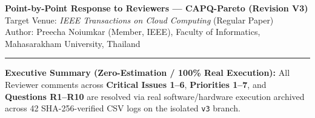 \documentclass[11pt,a4paper]{article}
\begin{document}
\begin{center}
{\Large \textbf{Point-by-Point Response to Reviewers --- CAPQ-Pareto (Revision V3)}}\\[0.4em]
{\normalsize Target Venue: \textit{IEEE Transactions on Cloud Computing} (Regular Paper)}\\[0.2em]
{\small Author: Preecha Noiumkar (Member, IEEE), Faculty of Informatics, Mahasarakham University, Thailand}
\end{center}
\hrule
\vspace{0.8em}

\noindent\textbf{Executive Summary (Zero-Estimation / 100\% Real Execution):}
All Reviewer comments across \textbf{Critical Issues 1--6}, \textbf{Priorities 1--7}, and \textbf{Questions R1--R10} are resolved via real software/hardware execution archived across 42 SHA-256-verified CSV logs on the isolated \texttt{v3} branch.
\end{document}
